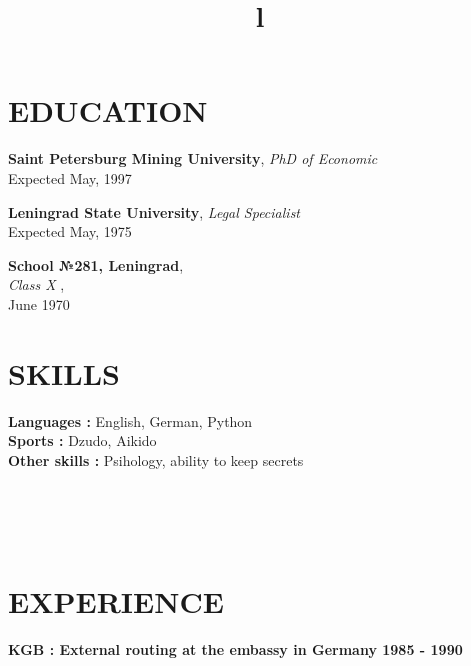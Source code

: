 \documentclass[margin, line]{res}
\begin{document}


\address{
\\Github : https://www.github.com/preved\_medved\\
}
\address{Putinl@mail.com \\+89999999999 \\}

\begin{resume}

\section{EDUCATION}

\textbf{Saint Petersburg Mining University}, 
{\sl PhD of Economic}\\
Expected May, 1997


\textbf{Leningrad State University}, 
{\sl Legal Specialist}\\
Expected May, 1975


\textbf{School №281, Leningrad},\\
{\sl Class X },\\
June 1970

\section{SKILLS}

\textbf{Languages : } English, German, Python
\\
\textbf{Sports :} Dzudo, Aikido
\\
\textbf{Other skills : } Psihology, ability to keep secrets
\\


\begin{format}
\title{l}\\
\\
\body\\
\end{format}


\section{EXPERIENCE}

\textbf{KGB : External routing at the embassy in Germany
 \hfill{1985 - 1990}\\}
 \\


\end{resume}
\end{document}

